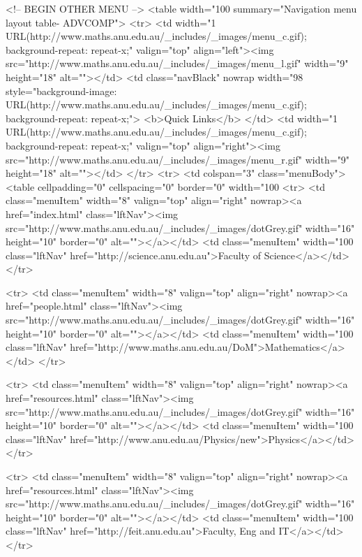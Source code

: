 \begin{html}
<!-- BEGIN OTHER MENU -->
<table width="100%
summary="Navigation menu layout table- ADVCOMP">
<tr>
  <td width="1%
  URL(http://www.maths.anu.edu.au/_includes/_images/menu_c.gif); background-repeat: repeat-x;"
  valign="top" align="left"><img src="http://www.maths.anu.edu.au/_includes/_images/menu_l.gif"
  width="9" height="18" alt=""></td>
                <td class="navBlack" nowrap width="98%
  style="background-image: URL(http://www.maths.anu.edu.au/_includes/_images/menu_c.gif);
  background-repeat: repeat-x;">
  <b>Quick Links</b>
  </td>
  <td width="1%
  URL(http://www.maths.anu.edu.au/_includes/_images/menu_c.gif); background-repeat: repeat-x;"
  valign="top" align="right"><img src="http://www.maths.anu.edu.au/_includes/_images/menu_r.gif"
  width="9" height="18" alt=""></td>
</tr>
<tr>
  <td colspan="3" class="menuBody">
  <table cellpadding="0" cellspacing="0" border="0"
  width="100%
  <tr>
    <td class="menuItem" width="8"
    valign="top" align="right" nowrap><a
    href="index.html"
    class="lftNav"><img src="http://www.maths.anu.edu.au/_includes/_images/dotGrey.gif" width="16"
    height="10" border="0" alt=""></a></td>
    <td class="menuItem" width="100%
    class="lftNav"
    href="http://science.anu.edu.au">Faculty of Science</a></td>
  </tr>

  <tr>
    <td class="menuItem" width="8"
    valign="top" align="right" nowrap><a
    href="people.html"
    class="lftNav"><img src="http://www.maths.anu.edu.au/_includes/_images/dotGrey.gif" width="16"
    height="10" border="0" alt=""></a></td>
    <td class="menuItem" width="100%
    class="lftNav"
    href="http://www.maths.anu.edu.au/DoM">Mathematics</a></td>
  </tr>

  <tr>
    <td class="menuItem" width="8"
    valign="top" align="right" nowrap><a
    href="resources.html"
    class="lftNav"><img src="http://www.maths.anu.edu.au/_includes/_images/dotGrey.gif" width="16"
    height="10" border="0" alt=""></a></td>
    <td class="menuItem" width="100%
    class="lftNav"
    href="http://www.anu.edu.au/Physics/new">Physics</a></td>
  </tr>


  <tr>
    <td class="menuItem" width="8"
    valign="top" align="right" nowrap><a
    href="resources.html"
    class="lftNav"><img src="http://www.maths.anu.edu.au/_includes/_images/dotGrey.gif" width="16"
    height="10" border="0" alt=""></a></td>
    <td class="menuItem" width="100%
    class="lftNav"
    href="http://feit.anu.edu.au">Faculty, Eng and IT</a></td>
  </tr>



\end{html}
